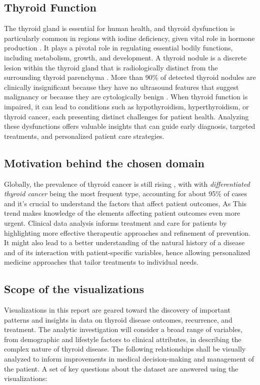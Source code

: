 \documentclass[12pt]{article}
\begin{document}
\subsection{Thyroid Function}
The thyroid gland is essential for human health, and thyroid dysfunction is particularly common in regions with iodine deficiency, given vital role in hormone production  \citep{Arthur&Beckett} .
It plays a pivotal role in regulating essential bodily functions, including metabolism, growth, and development. A thyroid nodule is a discrete lesion within the thyroid gland that is radiologically distinct from the surrounding thyroid parenchyma \citep{Cooper} .
More than 90\% of detected thyroid nodules are clinically insignificant because they have no ultrasound features that suggest malignancy or because they are cytologically benign \citep{Durante} .
When thyroid function is impaired, it can lead to conditions such as hypothyroidism, hyperthyroidism, or thyroid cancer, each presenting distinct challenges for patient health. %
Analyzing these dysfunctions offers valuable insights that can guide early diagnosis, targeted treatments, and personalized patient care strategies.



\subsection{Motivation  behind the chosen domain}
Globally, the prevalence of thyroid cancer is still rising , with  with \emph{differentiated thyroid cancer }  being the most frequent type, accounting for about 95\% of cases \citep{cabanillas2016} and it's crucial to understand the factors that affect patient outcomes, As This trend makes knowledge of the elements affecting patient outcomes even more urgent. Clinical data analysis informs treatment and care for patients by highlighting more effective therapeutic approaches and refinement of prevention. It might also lead to a better understanding of the natural history of a disease and of its interaction with patient-specific variables, hence allowing personalized medicine approaches that tailor treatments to individual needs.


\subsection{Scope of the visualizations}
Visualizations in this report are geared toward the discovery of important patterns and insights in data on thyroid disease outcomes, recurrence, and treatment. The analytic investigation will consider a broad range of variables, from demographic and lifestyle factors to clinical attributes, in describing the complex nature of thyroid disease. The following relationships shall be visually analyzed to inform improvements in medical decision-making and management of the patient. A set of key questions about the dataset are answered using the visualizations:
\end{document}
